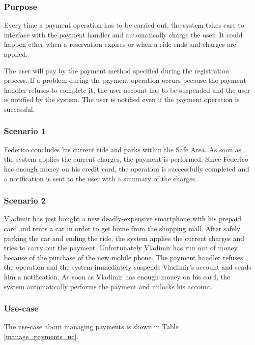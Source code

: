 \subsubsection{Purpose}
Every time a payment operation has to be carried out, the system takes care to interface with the payment handler and automatically charge the user. It could happen ether when a reservation expires or when a ride ends and charges are applied.

The user will pay by the payment method specified during the registration process. If a problem during the payment operation occurs because the payment handler refuses to complete it, the user account has to be suspended and the user is notified by the system. The user is notified even if the payment operation is successful.

\subsubsection{Scenario 1}
Federico concludes his current ride and parks within the Safe Area. As soon as the system applies the current charges, the payment is performed. Since Federico has enough money on his credit card, the operation is successfully completed and a notification is sent to the user with a summary of the charges.

\subsubsection{Scenario 2}
Vladimir has just bought a new deadly-expensive smartphone with his prepaid card and rents a car in order to get home from the shopping mall. After safely parking the car and ending the ride, the system applies the current charges and tries to carry out the payment. Unfortunately Vladimir has run out of money because of the purchase of the new mobile phone. The payment handler refuses the operation and the system immediately suspends Vladimir's account and sends him a notification. As soon as Vladimir has enough money on his card, the system automatically performs the payment and unlocks his account.

\subsubsection{Use-case}
The use-case about managing payments is shown in Table \ref{manage_payments_uc}.

